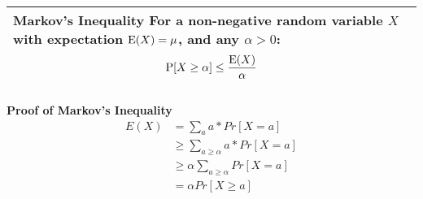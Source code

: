 {\tabulinesep=1mm
\begin{tabu}{|p{16cm} |}
\hline
\vspace{2 mm}
\textbf{Markov's Inequality } \newline
For a non-negative random variable $X$ with expectation $\text{E}(X) = \mu$, 
and any  $\alpha > 0$:
\[\text{P}[X \geq \alpha] \leq \frac{\text{E}(X)}{\alpha}\]
\vspace{2 mm}
\\
\hline
\end{tabu}
}

\begin{solution}
\textbf{Proof of Markov's Inequality}\newline
\begin{equation}
\begin{split}
E(X) &= \sum_a a * Pr[X = a] \\ \nonumber
&\geq \sum_{a \geq \alpha} a *  Pr[X = a] \\
&\geq \alpha \sum_{a \geq \alpha} Pr[X = a] \\
&= \alpha Pr[X \geq a]
\end{split}
\end{equation}
\end{solution}